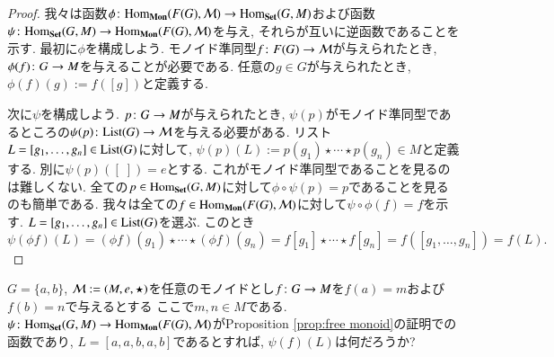 \begin{proof}


我々は函数$\phi\taking\Hom_\Mon(F(G),\mcM)\to\Hom_\Set(G,M)$および函数$\psi\taking\Hom_\Set(G,M)\to\Hom_\Mon(F(G),\mcM)$を与え, それらが互いに逆函数であることを示す. 最初に$\phi$を構成しよう. モノイド準同型$f\colon F(G)\rightarrow\mathcal{M}$が与えられたとき, $\phi(f)\colon G\rightarrow M$を与えることが必要である. 任意の$g\in G$が与えられたとき, $\phi(f)(g):=f([g])$と定義する.


次に$\psi$を構成しよう. $p\colon G\rightarrow M$が与えられたとき, $\psi(p)$がモノイド準同型であるところの$\psi(p)\taking\List(G)\to\mcM$を与える必要がある. リスト$L=[g_1,\ldots,g_n]\in\List(G)$に対して, $\psi(p)(L):=p(g_1)\star\cdots\star p(g_n)\in M$と定義する. 別に$\psi(p)([\;])=e$とする. これがモノイド準同型であることを見るのは難しくない. 全ての$p\in\Hom_\Set(G,M)$に対して$\phi\circ\psi(p)=p$であることを見るのも簡単である. 我々は全ての$f\in\Hom_\Mon(F(G),\mcM)$に対して$\psi\circ\phi(f)=f$を示す. $L=[g_1,\ldots,g_n]\in\List(G)$を選ぶ. このとき
$$\psi(\phi f)(L)=(\phi f)(g_1)\star\cdots\star(\phi f)(g_n)=f[g_1]\star\cdots\star f[g_n]=f([g_1,\ldots,g_n])=f(L).$$

\end{proof}

\begin{exercise}
$G=\{a,b\}$, $\mathcal{M}:=(M,e,\star)$を任意のモノイドとし$f\colon G\rightarrow M$を$f(a)=m$および$f(b)=n$で与えるとする ここで$m,n\in M$である. $\psi\taking\Hom_\Set(G,M)\to\Hom_\Mon(F(G),\mcM)$がProposition \ref{prop:free monoid}の証明での函数であり, $L=[a,a,b,a,b]$であるとすれば, $\psi(f)(L)$は何だろうか?
\end{exercise}

